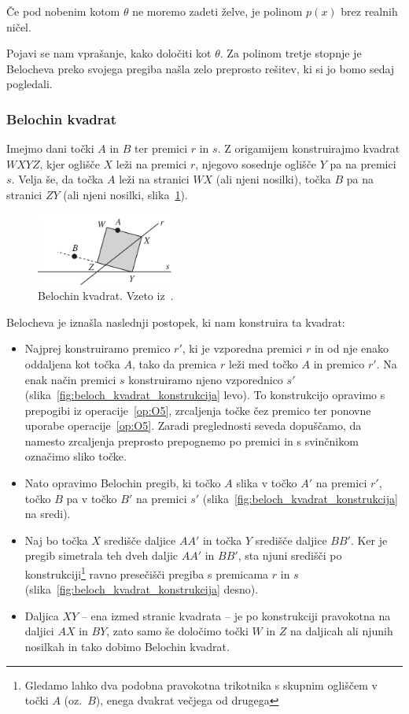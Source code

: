 Če pod nobenim kotom $\theta$ ne moremo zadeti želve, je polinom $p(x)$ brez realnih ničel.

Pojavi se nam vprašanje, kako določiti kot $\theta$. Za polinom tretje stopnje je Belocheva preko svojega pregiba našla zelo preprosto rešitev, ki si jo bomo sedaj pogledali.

\subsubsection*{Belochin kvadrat}

Imejmo dani točki $A$ in $B$ ter premici $r$ in $s$. Z origamijem konstruirajmo kvadrat $WXYZ$, kjer oglišče $X$ leži na premici $r$, njegovo sosednje oglišče $Y$ pa na premici $s$. Velja še, da točka $A$ leži na stranici $WX$ (ali njeni nosilki), točka $B$ pa na stranici $ZY$ (ali njeni nosilki, slika~\ref{fig:beloch_kvadrat}).

\begin{figure}[h]
    \centering
    \includegraphics[width=0.4\textwidth]{images/kubična enačba/beloch_kvadrat.png}
    \caption[Belochin kvadrat]{Belochin kvadrat. Vzeto iz~\cite[str.\ 309]{hull2011}.}
    \label{fig:beloch_kvadrat}
\end{figure}

Belocheva je iznašla naslednji postopek, ki nam konstruira ta kvadrat:
\begin{itemize}
    \item Najprej konstruiramo premico $r'$, ki je vzporedna premici $r$ in od nje enako oddaljena kot točka $A$, tako da premica $r$ leži med točko $A$ in premico $r'$. Na enak način premici $s$ konstruiramo njeno vzporednico $s'$ (slika~\ref{fig:beloch_kvadrat_konstrukcija} levo). To konstrukcijo opravimo s prepogibi iz operacije~\ref{op:O5}, zrcaljenja točke čez premico ter ponovne uporabe operacije~\ref{op:O5}. Zaradi preglednosti seveda dopuščamo, da namesto zrcaljenja preprosto prepognemo po premici in s svinčnikom označimo sliko točke.
    \item Nato opravimo Belochin pregib, ki točko $A$ slika v točko $A'$ na premici $r'$, točko $B$ pa v točko $B'$ na premici $s'$ (slika~\ref{fig:beloch_kvadrat_konstrukcija} na sredi).
    \item Naj bo točka $X$ središče daljice $AA'$ in točka $Y$ središče daljice $BB'$. Ker je pregib simetrala teh dveh daljic $AA'$ in $BB'$, sta njuni središči po konstrukciji\footnote{Gledamo lahko dva podobna pravokotna trikotnika s skupnim ogliščem v točki $A$ (oz.\ $B$), enega dvakrat večjega od drugega} ravno presečišči pregiba s premicama $r$ in $s$ (slika~\ref{fig:beloch_kvadrat_konstrukcija} desno).
    \item Daljica $XY$ -- ena izmed stranic kvadrata -- je po konstrukciji pravokotna na daljici $AX$ in $BY$, zato samo še določimo točki $W$ in $Z$ na daljicah ali njunih nosilkah in tako dobimo Belochin kvadrat.
\end{itemize}

